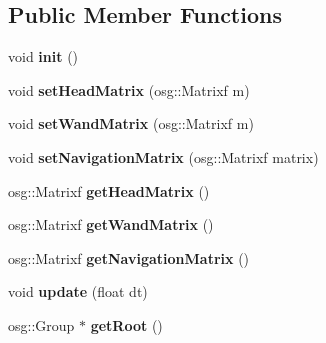 \subsection*{Public Member Functions}
\begin{DoxyCompactItemize}
\item 
\hypertarget{class_v_r_builder_app_a92aeff396418df3eb1ab0dd7416b725e}{
void {\bfseries init} ()}
\label{class_v_r_builder_app_a92aeff396418df3eb1ab0dd7416b725e}

\item 
\hypertarget{class_v_r_builder_app_acafad12e7a7764c9061b3fc79054533c}{
void {\bfseries setHeadMatrix} (osg::Matrixf m)}
\label{class_v_r_builder_app_acafad12e7a7764c9061b3fc79054533c}

\item 
\hypertarget{class_v_r_builder_app_a49e055893446481df93e5e5a1cd33aa7}{
void {\bfseries setWandMatrix} (osg::Matrixf m)}
\label{class_v_r_builder_app_a49e055893446481df93e5e5a1cd33aa7}

\item 
\hypertarget{class_v_r_builder_app_a3156d6cfbf45907805ee5a4337e9280b}{
void {\bfseries setNavigationMatrix} (osg::Matrixf matrix)}
\label{class_v_r_builder_app_a3156d6cfbf45907805ee5a4337e9280b}

\item 
\hypertarget{class_v_r_builder_app_a487d37a3da0613779cfdade515fe0e4d}{
osg::Matrixf {\bfseries getHeadMatrix} ()}
\label{class_v_r_builder_app_a487d37a3da0613779cfdade515fe0e4d}

\item 
\hypertarget{class_v_r_builder_app_a28dbfe8bea089179ad51241b36c8a009}{
osg::Matrixf {\bfseries getWandMatrix} ()}
\label{class_v_r_builder_app_a28dbfe8bea089179ad51241b36c8a009}

\item 
\hypertarget{class_v_r_builder_app_a7835252363057d0842197f9fd6da1d39}{
osg::Matrixf {\bfseries getNavigationMatrix} ()}
\label{class_v_r_builder_app_a7835252363057d0842197f9fd6da1d39}

\item 
\hypertarget{class_v_r_builder_app_a53a012a868cd168faadeb0af9153f10d}{
void {\bfseries update} (float dt)}
\label{class_v_r_builder_app_a53a012a868cd168faadeb0af9153f10d}

\item 
\hypertarget{class_v_r_builder_app_a16d97dd55cd57a7bb938ec7082710778}{
osg::Group $\ast$ {\bfseries getRoot} ()}
\label{class_v_r_builder_app_a16d97dd55cd57a7bb938ec7082710778}


\end{DoxyCompactItemize}
